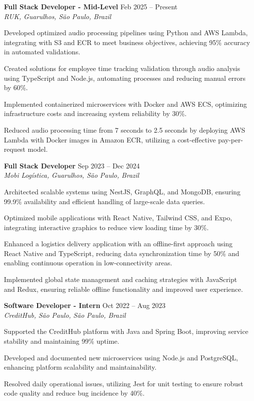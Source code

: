\documentclass[11pt,letterpaper]{article}
\begin{document}
\textbf{Full Stack Developer - Mid-Level} \hfill Feb 2025 – Present \\
\textit{RUK, Guarulhos, São Paulo, Brazil}
\begin{achievements}
    \item Developed optimized audio processing pipelines using Python and AWS Lambda, integrating with S3 and ECR to meet business objectives, achieving 95\% accuracy in automated validations.
    \item Created solutions for employee time tracking validation through audio analysis using TypeScript and Node.js, automating processes and reducing manual errors by 60\%.
    \item Implemented containerized microservices with Docker and AWS ECS, optimizing infrastructure costs and increasing system reliability by 30\%.
    \item Reduced audio processing time from 7 seconds to 2.5 seconds by deploying AWS Lambda with Docker images in Amazon ECR, utilizing a cost-effective pay-per-request model.
\end{achievements}

\textbf{Full Stack Developer} \hfill Sep 2023 – Dec 2024 \\
\textit{Mobi Logística, Guarulhos, São Paulo, Brazil}
\begin{achievements}
    \item Architected scalable systems using NestJS, GraphQL, and MongoDB, ensuring 99.9\% availability and efficient handling of large-scale data queries.
    \item Optimized mobile applications with React Native, Tailwind CSS, and Expo, integrating interactive graphics to reduce view loading time by 30\%.
    \item Enhanced a logistics delivery application with an offline-first approach using React Native and TypeScript, reducing data synchronization time by 50\% and enabling continuous operation in low-connectivity areas.
    \item Implemented global state management and caching strategies with JavaScript and Redux, ensuring reliable offline functionality and improved user experience.
\end{achievements}

\textbf{Software Developer - Intern} \hfill Oct 2022 – Aug 2023 \\
\textit{CreditHub, São Paulo, São Paulo, Brazil}
\begin{achievements}
    \item Supported the CreditHub platform with Java and Spring Boot, improving service stability and maintaining 99\% uptime.
    \item Developed and documented new microservices using Node.js and PostgreSQL, enhancing platform scalability and maintainability.
    \item Resolved daily operational issues, utilizing Jest for unit testing to ensure robust code quality and reduce bug incidence by 40\%.
\end{achievements}
\end{document}
